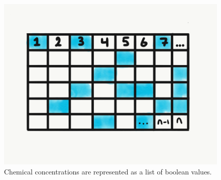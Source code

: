 \begin{figure}
    \centering
    \includegraphics[width=\textwidth]{img/initial_state}
 	\captionsetup{singlelinecheck=off,justification=raggedright}
  	\caption{Chemical concentrations are represented as a list of boolean values.}
    \label{fig:initial_state}
\end{figure}
